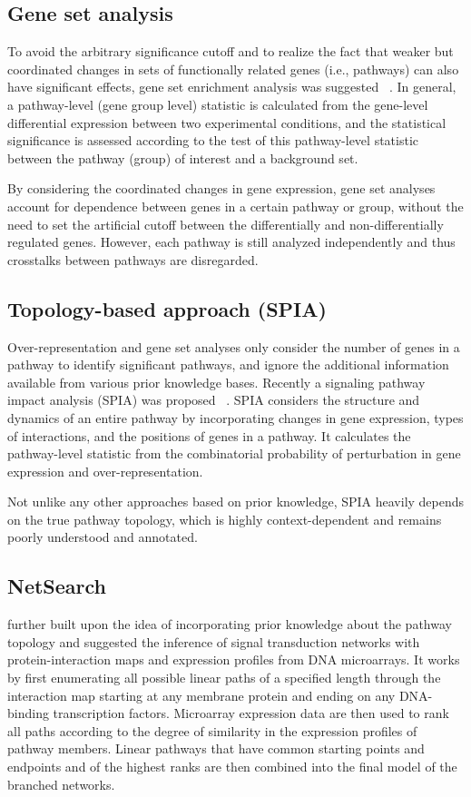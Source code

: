 \subsection{Gene set analysis}
To avoid the arbitrary significance cutoff and to realize the fact that weaker 
but coordinated changes in sets of functionally related genes (i.e., pathways) 
can also have significant effects, gene set enrichment analysis was suggested~%
\citep{Subramanian2005,Luo2009}. In general,
a pathway-level (gene group level) statistic is calculated from the gene-level 
differential expression between two experimental conditions, and the 
statistical significance is assessed according to the test of
this pathway-level statistic between the pathway (group) of interest and a 
background set.

By considering the coordinated changes in gene expression, gene set analyses 
account for dependence between genes in a certain pathway or group, without
the need to set the artificial cutoff between the differentially and 
non-differentially regulated genes. However,
each pathway is still analyzed independently and thus crosstalks between
pathways are disregarded.

\subsection{Topology-based approach (SPIA)}
Over-representation and gene set analyses only consider the number of genes 
in a pathway to identify significant pathways, and ignore the additional 
information available from various prior knowledge bases. Recently a signaling
pathway impact analysis (SPIA) was proposed~%
\citep{Tarca2009}. SPIA considers the structure and dynamics of an entire 
pathway by incorporating changes in gene expression, types of interactions, 
and the positions of genes in a pathway. 
It calculates the pathway-level statistic from the combinatorial probability 
of perturbation in gene expression and over-representation. 

Not unlike any other approaches based on prior knowledge,
SPIA heavily depends on the true pathway topology, which is highly
context-dependent and remains poorly understood and annotated.

\subsection{NetSearch}
\cite{Steffen2002} further built upon the idea of incorporating 
prior knowledge about the pathway topology and suggested
the inference of signal transduction networks with protein-interaction maps
and expression profiles from DNA microarrays.
It works by first enumerating all possible linear paths
of a specified length through the interaction map starting
at any membrane protein and ending on any DNA-binding
transcription factors.
Microarray expression data are then used
to rank all paths according to the degree of similarity in
the expression profiles of pathway members.
Linear pathways
that have common starting points and endpoints
and of the highest ranks are then combined into the final
model of the branched networks.

